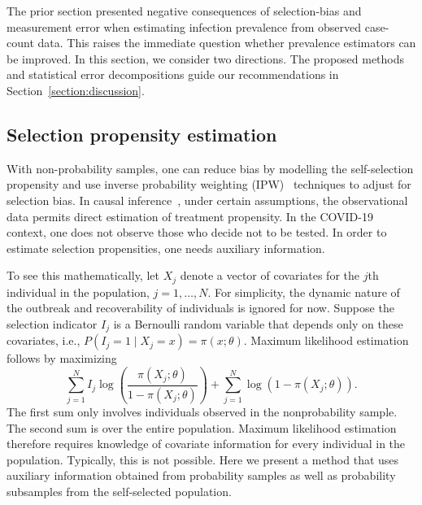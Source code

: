 \documentclass[12pt]{amsart}
\numberwithin{equation}{section}
\theoremstyle{plain}
\begin{document}
The prior section presented negative consequences of selection-bias and measurement error when estimating infection prevalence from observed case-count data.  This raises the immediate question whether prevalence estimators can be improved.  In this section, we consider two directions.
The proposed methods and statistical error decompositions guide our recommendations in Section~\ref{section:discussion}.

\subsection{Selection propensity estimation}

With non-probability samples, one can reduce bias by modelling the self-selection propensity and use inverse probability weighting (IPW)~\citep{Elliott2017} techniques to adjust for selection bias.  In causal inference~\citep{Hernan2020}, under certain assumptions, the observational data permits direct estimation of treatment propensity.  In the COVID-19 context, one does not observe those who decide not to be tested.  In order to estimate selection propensities, one needs auxiliary information.

To see this mathematically, let $X_j$ denote a vector of covariates for the $j$th individual in the population, $j=1,\ldots,N$.  For simplicity, the dynamic nature of the outbreak and recoverability of individuals is ignored for now. Suppose the selection indicator $I_j$ is a Bernoulli random variable that depends only on these covariates, i.e., $P(I_j = 1 \mid X_j = x) = \pi (x; \theta)$. Maximum likelihood estimation follows by maximizing
\begin{equation}
\label{eq:propensity}
\sum_{j=1}^N I_j \log \left( \frac{\pi (X_j; \theta)}{1-\pi(X_j; \theta)} \right) + \sum_{j=1}^N \log \left( 1 - \pi (X_j; \theta) \right).
\end{equation}
The first sum only involves individuals observed in the nonprobability sample.
The second sum is over the entire population.  Maximum likelihood estimation therefore requires knowledge of covariate information for every individual in the population.  Typically, this is not possible.  Here we present a method that uses auxiliary information obtained from probability samples as well as probability subsamples from the self-selected population.
\end{document}

